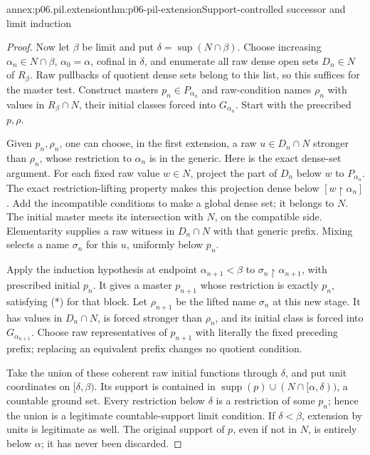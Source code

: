 \begin{annexitem}{annex:p06.pil.extension}{thm:p06-pil-extension}{Support-controlled successor and limit induction}
\begin{proof}
Now let \(\beta\) be limit and put \(\delta=\sup(N\cap\beta)\).
Choose increasing \(\alpha_n\in N\cap\beta\), \(\alpha_0=\alpha\),
cofinal in \(\delta\), and enumerate all raw dense open sets
\(D_n\in N\) of \(R_\beta\). Raw pullbacks of quotient dense sets
belong to this list, so this suffices for the master test. Construct
masters \(p_n\in P_{\alpha_n}\) and raw-condition names \(\rho_n\)
with values in \(R_\beta\cap N\), their initial classes forced into
\(G_{\alpha_n}\). Start with the prescribed \(p,\rho\).

Given \(p_n,\rho_n\), one can choose, in the first extension, a raw
\(u\in D_n\cap N\) stronger than \(\rho_n\), whose restriction to
\(\alpha_n\) is in the generic. Here is the exact dense-set argument.
For each fixed raw value \(w\in N\), project the part of \(D_n\)
below \(w\) to \(P_{\alpha_n}\). The exact restriction-lifting
property makes this projection dense below \([w\mathbin{\upharpoonright}
\alpha_n]\). Add the incompatible conditions to make a global dense
set; it belongs to \(N\). The initial master meets its intersection
with \(N\), on the compatible side. Elementarity supplies a raw
witness in \(D_n\cap N\) with that generic prefix. Mixing selects a
name \(\sigma_n\) for this \(u\), uniformly below \(p_n\).

Apply the induction hypothesis at endpoint \(\alpha_{n+1}<\beta\)
to \(\sigma_n\mathbin{\upharpoonright}\alpha_{n+1}\), with prescribed
initial \(p_n\). It gives a master \(p_{n+1}\) whose restriction is
exactly \(p_n\), satisfying (*) for that block. Let \(\rho_{n+1}\)
be the lifted name \(\sigma_n\) at this new stage. It has values in
\(D_n\cap N\), is forced stronger than \(\rho_n\), and its initial
class is forced into \(G_{\alpha_{n+1}}\). Choose raw representatives
of \(p_{n+1}\) with literally the fixed preceding prefix; replacing an
equivalent prefix changes no quotient condition.

Take the union of these coherent raw initial functions through
\(\delta\), and put unit coordinates on \([\delta,\beta)\).
Its support is contained in
\(\operatorname{supp}(p)\cup(N\cap[\alpha,\delta))\), a countable
ground set. Every restriction below \(\delta\) is a restriction of
some \(p_n\); hence the union is a legitimate countable-support limit
condition. If \(\delta<\beta\), extension by units is legitimate as
well. The original support of \(p\), even if not in \(N\), is entirely
below \(\alpha\); it has never been discarded.


\end{proof}
\end{annexitem}
